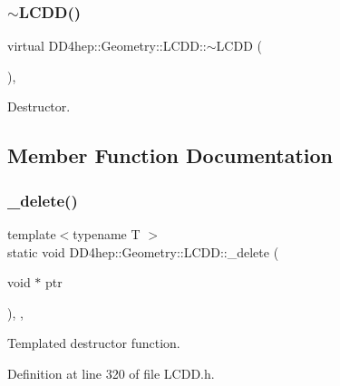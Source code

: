 \subsubsection{\texorpdfstring{$\sim$\+L\+C\+D\+D()}{~LCDD()}}
{\footnotesize\ttfamily virtual D\+D4hep\+::\+Geometry\+::\+L\+C\+D\+D\+::$\sim$\+L\+C\+DD (\begin{DoxyParamCaption}{ }\end{DoxyParamCaption})\hspace{0.3cm}{\ttfamily [virtual]}, {\ttfamily [default]}}



Destructor. 



\subsection{Member Function Documentation}
\hypertarget{class_d_d4hep_1_1_geometry_1_1_l_c_d_d_a89aee1642faca3e9c15df1a4e389b466}{}\label{class_d_d4hep_1_1_geometry_1_1_l_c_d_d_a89aee1642faca3e9c15df1a4e389b466} 
\subsubsection{\texorpdfstring{\+\_\+delete()}{\_delete()}}
{\footnotesize\ttfamily template$<$typename T $>$ \\
static void D\+D4hep\+::\+Geometry\+::\+L\+C\+D\+D\+::\+\_\+delete (\begin{DoxyParamCaption}\item[{void $\ast$}]{ptr }\end{DoxyParamCaption})\hspace{0.3cm}{\ttfamily [inline]}, {\ttfamily [static]}, {\ttfamily [protected]}}



Templated destructor function. 



Definition at line 320 of file L\+C\+D\+D.\+h.

\hypertarget{class_d_d4hep_1_1_geometry_1_1_l_c_d_d_a438cd36346d10c381b99bdfaa80ba50e}{}\label{class_d_d4hep_1_1_geometry_1_1_l_c_d_d_a438cd36346d10c381b99bdfaa80ba50e} 
